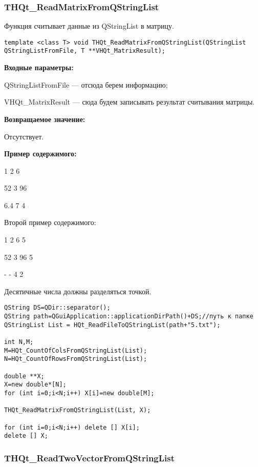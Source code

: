 \documentclass[a4paper,12pt]{article}
\begin{document}
\subsubsection{THQt\_ReadMatrixFromQStringList}\label{THQt_ReadMatrixFromQStringList}

Функция считывает данные из QStringList в матрицу.


\begin{lstlisting}[label=code_syntax_THQt_ReadMatrixFromQStringList,caption=Синтаксис]
template <class T> void THQt_ReadMatrixFromQStringList(QStringList QStringListFromFile, T **VHQt_MatrixResult);
\end{lstlisting}

\textbf{Входные параметры:}

 
QStringListFromFile --- отсюда берем информацию;

VHQt\_MatrixResult --- сюда будем записывать результат считывания матрицы.

\textbf{Возвращаемое значение:}

Отсутствует.

\textbf{Пример содержимого:}

1	2	6

52	3	96

6.4	7	4

    Второй пример содержимого:
	
1	2	6	5

52	3	96	5

-	-	4   2

Десятичные числа должны разделяться точкой.


\begin{lstlisting}[label=code_use_THQt_ReadMatrixFromQStringList,caption=Пример использования]
QString DS=QDir::separator();
QString path=QGuiApplication::applicationDirPath()+DS;//путь к папке
QStringList List = HQt_ReadFileToQStringList(path+"5.txt");

int N,M;
M=HQt_CountOfColsFromQStringList(List);
N=HQt_CountOfRowsFromQStringList(List);

double **X;
X=new double*[N];
for (int i=0;i<N;i++) X[i]=new double[M];

THQt_ReadMatrixFromQStringList(List, X);

for (int i=0;i<N;i++) delete [] X[i];
delete [] X;
\end{lstlisting}

\subsubsection{THQt\_ReadTwoVectorFromQStringList}\label{THQt_ReadTwoVectorFromQStringList}
\end{document}
